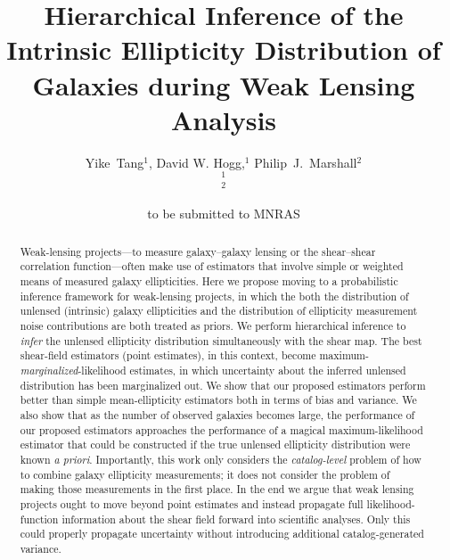 \documentclass[useAMS,usenatbib]{mn2e}
\title[Hierarchical Inference in Weak Lensing]
{Hierarchical Inference of the Intrinsic Ellipticity
Distribution of Galaxies during Weak Lensing Analysis}
\author[Tang et al]{%
  Yike~Tang$^{1}$,
  David W. Hogg,$^{1}$
  Philip~J.~Marshall$^{2}$
  \medskip\\
  $^1$\nyu\\
  $^2$\oxford
}
\begin{document}
             
\date{to be submitted to MNRAS}
             
\pagerange{\pageref{firstpage}--\pageref{lastpage}}

\maketitle           

\label{firstpage}


\begin{abstract}
Weak-lensing projects---to measure galaxy--galaxy lensing or the shear--shear
correlation function---often make use of estimators that involve simple or weighted
means of measured galaxy ellipticities.  Here we propose moving to a probabilistic inference
framework for weak-lensing projects, in which the both the distribution of unlensed
(intrinsic) galaxy ellipticities and the distribution of ellipticity measurement noise contributions
are both treated as priors.  We perform hierarchical inference to \emph{infer} the
unlensed ellipticity distribution simultaneously with the shear map.  The best
shear-field estimators (point estimates), in this context, become
maximum-\emph{marginalized}-likelihood estimates, in which uncertainty about the
inferred unlensed distribution has been marginalized out.  We show that our proposed
estimators perform better than simple mean-ellipticity estimators both in terms of
bias and variance.  We also show that as the number of observed galaxies becomes
large, the performance of our proposed estimators approaches the performance of a
magical maximum-likelihood estimator that could be constructed if the true unlensed
ellipticity distribution were known \textit{a priori}.  Importantly, this work only
considers the \emph{catalog-level} problem of how to combine galaxy ellipticity
measurements; it does not consider the problem of making those measurements in the
first place.  In the end we argue that weak lensing projects ought to move beyond
point estimates and instead propagate full likelihood-function information about
the shear field forward into scientific analyses.  Only this could properly
propagate uncertainty without introducing additional catalog-generated variance.
\end{abstract}

\end{document}
